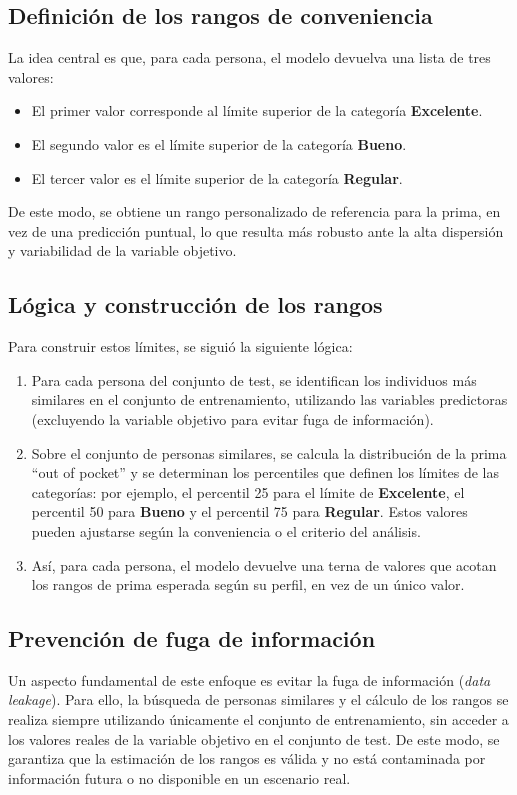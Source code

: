 \documentclass[12pt]{article}
\begin{document}
\subsection*{Definición de los rangos de conveniencia}
La idea central es que, para cada persona, el modelo devuelva una lista de tres valores:\\
\begin{itemize}
    \item El primer valor corresponde al límite superior de la categoría \textbf{Excelente}.
    \item El segundo valor es el límite superior de la categoría \textbf{Bueno}.
    \item El tercer valor es el límite superior de la categoría \textbf{Regular}.
\end{itemize}
De este modo, se obtiene un rango personalizado de referencia para la prima, en vez de una predicción puntual, lo que resulta más robusto ante la alta dispersión y variabilidad de la variable objetivo.

\subsection*{Lógica y construcción de los rangos}
Para construir estos límites, se siguió la siguiente lógica:
\begin{enumerate}
    \item Para cada persona del conjunto de test, se identifican los individuos más similares en el conjunto de entrenamiento, utilizando las variables predictoras (excluyendo la variable objetivo para evitar fuga de información).
    \item Sobre el conjunto de personas similares, se calcula la distribución de la prima “out of pocket” y se determinan los percentiles que definen los límites de las categorías: por ejemplo, el percentil 25 para el límite de \textbf{Excelente}, el percentil 50 para \textbf{Bueno} y el percentil 75 para \textbf{Regular}. Estos valores pueden ajustarse según la conveniencia o el criterio del análisis.
    \item Así, para cada persona, el modelo devuelve una terna de valores que acotan los rangos de prima esperada según su perfil, en vez de un único valor.
\end{enumerate}

\subsection*{Prevención de fuga de información}
Un aspecto fundamental de este enfoque es evitar la fuga de información (\textit{data leakage}). Para ello, la búsqueda de personas similares y el cálculo de los rangos se realiza siempre utilizando únicamente el conjunto de entrenamiento, sin acceder a los valores reales de la variable objetivo en el conjunto de test. De este modo, se garantiza que la estimación de los rangos es válida y no está contaminada por información futura o no disponible en un escenario real.
\end{document}
